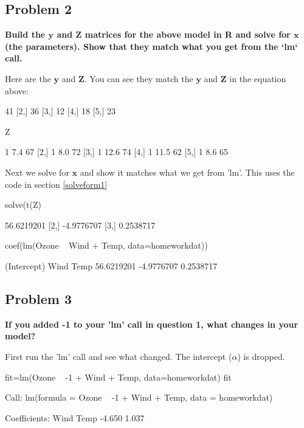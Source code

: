 \subsection*{Problem 2}
{\bf Build the $\mathbf{y}$ and $\mathbf{Z}$ matrices for the above model in R and solve for $\mathbf{x}$ (the parameters).  Show that they match what you get from the `lm` call.}

Here are the $\mathbf{y}$ and $\mathbf{Z}$. You can see they match the $\mathbf{y}$ and $\mathbf{Z}$ in the equation above:
\begin{Schunk}
\begin{Soutput}
     [,1]
[1,]   41
[2,]   36
[3,]   12
[4,]   18
[5,]   23
\end{Soutput}
\begin{Sinput}
 Z
\end{Sinput}
\begin{Soutput}
     [,1] [,2] [,3]
[1,]    1  7.4   67
[2,]    1  8.0   72
[3,]    1 12.6   74
[4,]    1 11.5   62
[5,]    1  8.6   65
\end{Soutput}
\end{Schunk}
Next we solve for $$ and show it matches what we get from 'lm'. This uses the code in section \ref{solveform1}
\begin{Schunk}
\begin{Sinput}
 solve(t(Z)%*%Z)%*%t(Z)%*%y
\end{Sinput}
\begin{Soutput}
           [,1]
[1,] 56.6219201
[2,] -4.9776707
[3,]  0.2538717
\end{Soutput}
\begin{Sinput}
 coef(lm(Ozone ~ Wind + Temp, data=homeworkdat))
\end{Sinput}
\begin{Soutput}
(Intercept)        Wind        Temp 
 56.6219201  -4.9776707   0.2538717 
\end{Soutput}
\end{Schunk}

\subsection*{Problem 3}
{\bf If you added -1 to your 'lm' call in question 1, what changes in your model?}

First run the 'lm' call and see what changed.  The intercept ($\alpha$) is dropped.
\begin{Schunk}
\begin{Sinput}
 fit=lm(Ozone ~ -1 + Wind + Temp, data=homeworkdat)
 fit
\end{Sinput}
\begin{Soutput}
Call:
lm(formula = Ozone ~ -1 + Wind + Temp, data = homeworkdat)

Coefficients:
  Wind    Temp  
-4.650   1.037  
\end{Soutput}
\end{Schunk}

